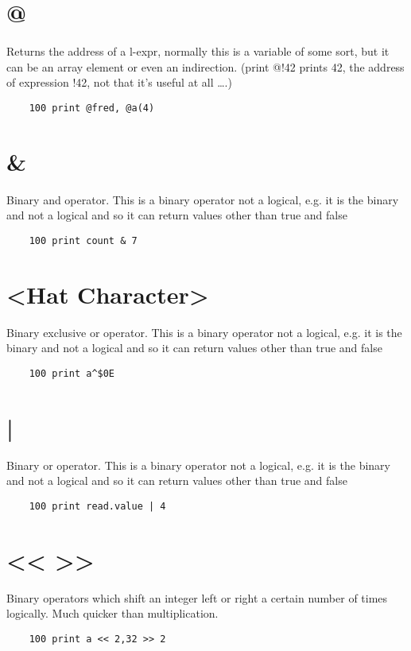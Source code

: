 \section*{@}
Returns the address of a l-expr, normally this is a variable of some sort, but it can be an array element or even an indirection. (print @!42 prints 42, the address of expression !42, not that it’s useful at all ….)
\example{}
\begin{verbatim}
	100 print @fred, @a(4)
\end{verbatim}

\section*{\&}
Binary and operator. This is a binary operator not a logical, e.g. it is the binary and not a logical and so it can return values other than true and false
\example{}
\begin{verbatim}
	100 print count & 7
\end{verbatim}

\section*{<Hat Character>}
Binary exclusive or operator. This is a binary operator not a logical, e.g. it is the binary and not a logical and so it can return values other than true and false
\example{}
\begin{verbatim}
	100 print a^$0E
\end{verbatim}

\section*{|}
Binary or operator. This is a binary operator not a logical, e.g. it is the binary and not a logical and so it can return values other than true and false
\example{}
\begin{verbatim}
	100 print read.value | 4
\end{verbatim}

\section*{<< >>}
Binary operators which shift an integer left or right a certain number of times logically. Much quicker than multiplication.
\example{}
\begin{verbatim}
	100 print a << 2,32 >> 2
\end{verbatim}

